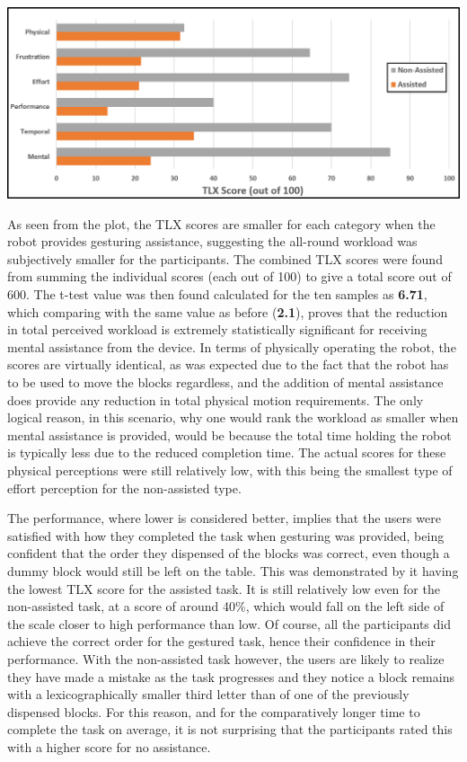 \documentclass[11pt]{article}
\begin{document}
\begin{center}
\includegraphics[width=\textwidth]{images/tlxResults.png}
\label{figure:tlxResults}
\end{center}

As seen from the plot, the TLX scores are smaller for each category when the robot provides gesturing assistance, suggesting the all-round workload was subjectively smaller for the participants. The combined TLX scores were found from summing the individual scores (each out of 100) to give a total score out of 600. The t-test value was then found calculated for the ten samples as \textbf{6.71}, which comparing with the same value as before (\textbf{2.1}), proves that the reduction in total perceived workload is extremely statistically significant for receiving mental assistance from the device. In terms of physically operating the robot, the scores are virtually identical, as was expected due to the fact that the robot has to be used to move the blocks regardless, and the addition of mental assistance does provide any reduction in total physical motion requirements. The only logical reason, in this scenario, why one would rank the workload as smaller when mental assistance is provided, would be because the total time holding the robot is typically less due to the reduced completion time. The actual scores for these physical perceptions were still relatively low, with this being the smallest type of effort perception for the non-assisted type. 

The performance, where lower is considered better, implies that the users were satisfied with how they completed the task when gesturing was provided, being confident that the order they dispensed of the blocks was correct, even though a dummy block would still be left on the table. This was demonstrated by it having the lowest TLX score for the assisted task. It is still relatively low even for the non-assisted task, at a score of around 40\%, which would fall on the left side of the scale closer to high performance than low. Of course, all the participants did achieve the correct order for the gestured task, hence their confidence in their performance. With the non-assisted task however, the users are likely to realize they have made a mistake as the task progresses and they notice a block remains with a lexicographically smaller third letter than of one of the previously dispensed blocks. For this reason, and for the comparatively longer time to complete the task on average, it is not surprising that the participants rated this with a higher score for no assistance. 
\end{document}
